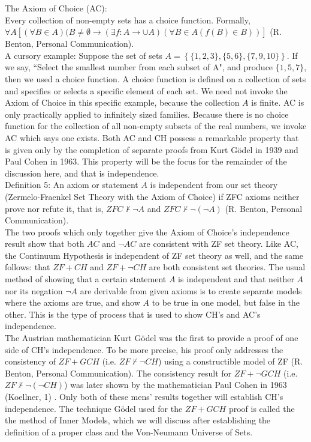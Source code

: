 \documentclass[10pt,letterpaper]{amsart}
\numberwithin{equation}{section}
\theoremstyle{plain}
\theoremstyle{definition}
\numberwithin{equation}{section}
\begin{document}
\noindent The Axiom of Choice (AC): \\
Every collection of non-empty sets has a choice function. Formally, \\
$\forall A \left[ (\forall B \in A )(B\neq \emptyset \rightarrow (\exists f:A \rightarrow \cup A) (\forall B \in A (f(B)\in B))\right] $ (R. Benton, Personal Communication). \\

A cursory example: Suppose the set of sets $A=\left\{ \{1,2,3\}, \{5,6\}, \{7,9,10\} \right \}$. If we say, ``Select the smallest number from each subset of A", and produce $\{1,5,7\}$, then we used a choice function. A choice function is defined on a collection of sets and specifies or selects a specific element of each set. We need not invoke the Axiom of Choice in this specific example, because the collection $A$ is finite. AC is only practically applied to infinitely sized families. Because there is no choice function for the collection of all non-empty subsets of the real numbers, we invoke AC which says one exists. Both AC and CH possess a remarkable property that is given only by the completion of separate proofs from Kurt Gödel in 1939 and Paul Cohen in 1963. This property will be the focus for the remainder of the discussion here, and that is independence.\\

\noindent Definition 5:
An axiom or statement $A$ is independent from our set theory (Zermelo-Fraenkel Set Theory with the Axiom of Choice) if ZFC axioms neither prove nor refute it, that is, $ZFC \nvdash \neg A$ and $ZFC \nvdash \neg(\neg A)$ (R. Benton, Personal Communication). \\

The two proofs which only together give the Axiom of Choice's independence result show that both $AC$ and $\neg AC$ are consistent with ZF set theory. Like AC, the Continuum Hypothesis is independent of ZF set theory as well, and the same follows: that $ZF+CH$ and $ZF+\neg CH$ are both consistent set theories. The usual method of showing that a certain statement $A$ is independent and that neither $A$ nor its negation $\neg A$ are derivable from given axioms is to create separate models where the axioms are true, and show $A$ to be true in one model, but false in the other. This is the type of process that is used to show CH's and AC's independence. \\

The Austrian mathematician Kurt Gödel was the first to provide a proof of one side of CH's independence. To be more precise, his proof only addresses the consistency of $ZF+GCH$ (i.e. $ZF \nvdash \neg CH$) using a constructible model of ZF (R. Benton, Personal Communication). The consistency result for $ZF+\neg GCH$ (i.e. $ZF  \nvdash \neg(\neg CH)$) was later shown by the mathematician Paul Cohen in 1963 (Koellner, 1) . Only both of these mens' results together will establish CH's independence. The technique Gödel used for the $ZF+GCH$ proof is called the the method of Inner Models, which we will discuss after establishing the definition of a proper class and the Von-Neumann Universe of Sets. \\
\end{document}
